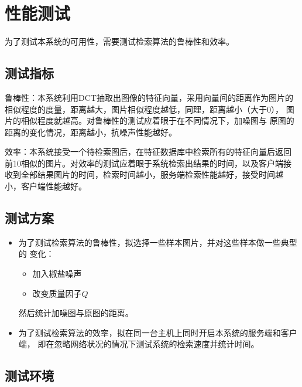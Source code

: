 
\newcommand{\insimg}[1] {
  \begin{subfigure}[b]{0.2\textwidth}
    \centering
    \texttt{[image: images/\#1]}
  \end{subfigure}
}

\chapter{性能测试}
\label{chap:benchmark}

为了测试本系统的可用性，需要测试检索算法的鲁棒性和效率。

\section{测试指标}
\label{sec:benchmark-index}
鲁棒性：本系统利用DCT抽取出图像的特征向量，采用向量间的距离作为图片的
相似程度的度量，距离越大，图片相似程度越低，同理，距离越小（大于0），
图片的相似程度就越高。对鲁棒性的测试应着眼于在不同情况下，加噪图与
原图的距离的变化情况，距离越小，抗噪声性能越好。

效率：本系统接受一个待检索图后，在特征数据库中检索所有的特征向量后返回
前10相似的图片。对效率的测试应着眼于系统检索出结果的时间，以及客户端接
收到全部结果图片的时间，检索时间越小，服务端检索性能越好，接受时间越
小，客户端性能越好。

\section{测试方案}
\label{sec:benchmark-scheme}

\begin{itemize}
\item 为了测试检索算法的鲁棒性，拟选择一些样本图片，并对这些样本做一些典型的
变化：
\begin{itemize}
\item 加入椒盐噪声
\item 改变质量因子$Q$
\end{itemize}
然后统计加噪图与原图的距离。

\item 为了测试检索算法的效率，拟在同一台主机上同时开启本系统的服务端和客户端，
即在忽略网络状况的情况下测试系统的检索速度并统计时间。
\end{itemize}

\section{测试环境}
\label{sec:benchmark-env}

